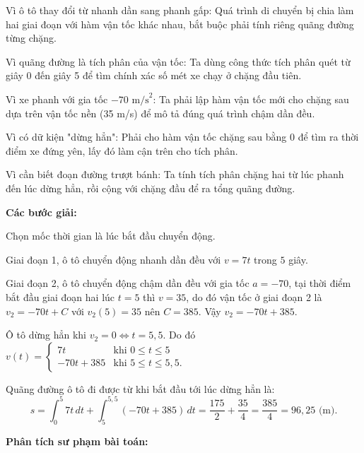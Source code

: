 \documentclass[12pt,a4paper,oneside]{book}
\theoremstyle{theorem}
\theoremstyle{definition}
\begin{document}
Vì ô tô thay đổi từ nhanh dần sang phanh gấp: Quá trình di chuyển bị chia làm hai giai đoạn với hàm vận tốc khác nhau, bắt buộc phải tính riêng quãng đường từng chặng.

Vì quãng đường là tích phân của vận tốc: Ta dùng công thức tích phân quét từ giây 0 đến giây 5 để tìm chính xác số mét xe chạy ở chặng đầu tiên.

Vì xe phanh với gia tốc \(-70\text{ m/s}^2\): Ta phải lập hàm vận tốc mới cho chặng sau dựa trên vận tốc nền (35 m/s) để mô tả đúng quá trình chậm dần đều.

Vì có dữ kiện "dừng hẳn": Phải cho hàm vận tốc chặng sau bằng 0 để tìm ra thời điểm xe đứng yên, lấy đó làm cận trên cho tích phân.

Vì cần biết đoạn đường trượt bánh: Ta tính tích phân chặng hai từ lúc phanh đến lúc dừng hẳn, rồi cộng với chặng đầu để ra tổng quãng đường.
\begin{center}
    \textbf{Các bước giải:}
\end{center} 

 Chọn mốc thời gian là lúc bắt đầu chuyển động.

 Giai đoạn 1, ô tô chuyển động nhanh dần đều với $v = 7t$ trong $5$ giây.

 Giai đoạn 2, ô tô chuyển động chậm dần đều với gia tốc $a = -70$, tại thời điểm bắt đầu giai đoạn hai lúc $t = 5$ thì $v = 35$, do đó vận tốc ở giai đoạn 2 là $v_2 = -70t + C$ với $v_2(5) = 35$ nên $C = 385$. Vậy $v_2 = -70t + 385$.

Ô tô dừng hẳn khi $v_2 = 0 \iff t = 5,5$. Do đó $v(t) = \begin{cases} 7t & \text{khi } 0 \le t \le 5 \\ -70t + 385 & \text{khi } 5 \le t \le 5,5. \end{cases}$

 Quãng đường ô tô đi được từ khi bắt đầu tới lúc dừng hẳn là:
$$s = \int_0^5 7t \, dt + \int_5^{5,5} (-70t + 385) \, dt = \frac{175}{2} + \frac{35}{4} = \frac{385}{4} = 96,25\text{ (m).}$$
\begin{center}
\textbf{Phân tích sư phạm bài toán:}
\end{center}
\end{document}
